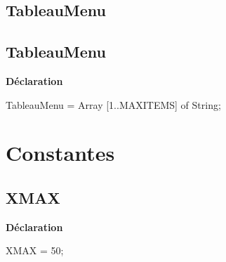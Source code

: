 \documentclass{report}
\newif\ifpdf
\begin{document}
\subsection*{\large{\textbf{TableauMenu}}\normalsize\hspace{1ex}\hrulefill}
\else
\subsection*{TableauMenu}
\fi
\label{Types-TableauMenu}
\begin{list}{}{
\setlength{\itemindent}{0cm}
\setlength{\listparindent}{0cm}
\setlength{\leftmargin}{\evensidemargin}
\addtolength{\leftmargin}{\tmplength}
\settowidth{\labelsep}{X}
\addtolength{\leftmargin}{\labelsep}
\setlength{\labelwidth}{\tmplength}
}
\item[\textbf{Déclaration}\hfill]
\ifpdf
\begin{flushleft}
\fi
\begin{ttfamily}
TableauMenu = Array [1..MAXITEMS] of String;\end{ttfamily}

\ifpdf
\end{flushleft}
\fi

\end{list}
\section{Constantes}
\ifpdf
\subsection*{\large{\textbf{XMAX}}\normalsize\hspace{1ex}\hrulefill}
\else
\subsection*{XMAX}
\fi
\label{Types-XMAX}
\begin{list}{}{
\setlength{\itemindent}{0cm}
\setlength{\listparindent}{0cm}
\setlength{\leftmargin}{\evensidemargin}
\addtolength{\leftmargin}{\tmplength}
\settowidth{\labelsep}{X}
\addtolength{\leftmargin}{\labelsep}
\setlength{\labelwidth}{\tmplength}
}
\item[\textbf{Déclaration}\hfill]
\ifpdf
\begin{flushleft}
\fi
\begin{ttfamily}
XMAX = 50;\end{ttfamily}

\ifpdf
\end{flushleft}
\fi

\end{list}
\ifpdf
\end{document}
